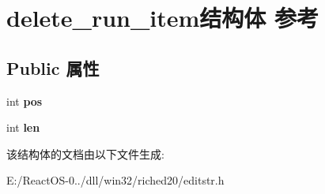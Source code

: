 \hypertarget{structdelete__run__item}{}\section{delete\+\_\+run\+\_\+item结构体 参考}
\label{structdelete__run__item}
\subsection*{Public 属性}
\begin{DoxyCompactItemize}
\item 
\mbox{\label{structdelete__run__item_a6f01a41079f8dc82a224ef613b2df84c}} 
int {\bfseries pos}
\item 
\mbox{\label{structdelete__run__item_a406f1524afd92840f29b0a91a4fd654e}} 
int {\bfseries len}
\end{DoxyCompactItemize}


该结构体的文档由以下文件生成\+:\begin{DoxyCompactItemize}
\item 
E\+:/\+React\+O\+S-\/0../dll/win32/riched20/editstr.\+h\end{DoxyCompactItemize}
